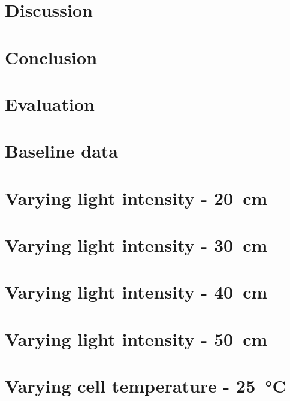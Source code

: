 \documentclass[a4paper,11pt]{article}
\begin{document}
\section{Discussion}

\section{Conclusion}


\section{Evaluation}


\begin{appendices}
    \label{appendix}
    \section{Baseline data}
    \label{dat:baseline}
    
    \section{Varying light intensity - \SI{20}{\centi\metre}}
    \label{dat:d20}
        
    \section{Varying light intensity - \SI{30}{\centi\metre}}
    \label{dat:d30}
        
    \section{Varying light intensity - \SI{40}{\centi\metre}}
    \label{dat:d40}
        
    \section{Varying light intensity - \SI{50}{\centi\metre}}
    \label{dat:d50}
        
    \section{Varying cell temperature - \SI{25}{\celsius}}
    \label{dat:t25}
        

\end{appendices}
\end{document}

